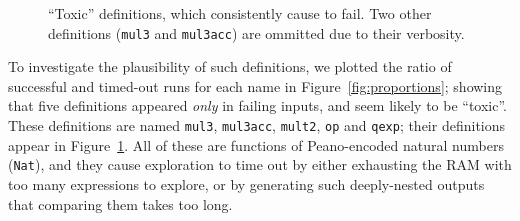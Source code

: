 \begin{figure}
  \iffalse
  \begin{verbatim}
    (define-fun-rec mul3 ((x Nat) (y Nat) (z Nat)) Nat
      (match x
        (case Z Z)                          ;; Base case for 0 * y * z
        (case (S x2)
          (match y
            (case Z Z)                      ;; Base case for x * 0 * z
            (case (S x3)
              (match z
                (case Z Z)                  ;; Base case for x * y * 0
                (case (S x4)
                  (match x2
                    (case Z
                      (match x3
                        (case Z
                          (match x4
                            (case Z (S Z))  ;; Base case for 1 * 1 * 1
                            (case (S x5)
                              (S (add3 (mul3 Z Z x4)
                                       (add3 (mul3 (S Z) Z x4)
                                             (mul3 Z (S Z) x4)
                                             (mul3 Z Z (S Z)))
                                       (add3 Z Z x4))))))
                        (case (S x6)
                          (S (add3 (mul3 Z x3 x4)
                                   (add3 (mul3 (S Z) x3 x4)
                                         (mul3 Z (S Z) x4)
                                         (mul3 Z x3 (S Z)))
                                   (add3 Z x3 x4))))))
                    (case (S x7)
                      (S (add3 (mul3 x2 x3 x4)
                               (add3 (mul3 (S Z) x3 x4)
                                     (mul3 x2 (S Z) x4)
                                     (mul3 x2 x3 (S Z)))
                               (add3 x2 x3 x4))))))))))))
  \end{verbatim}
  \fi
  \caption{``Toxic'' definitions, which consistently cause \quickspec{} to fail. Two
    other definitions (\texttt{mul3} and \texttt{mul3acc}) are ommitted due to
    their verbosity.}
  \label{fig:faildefs}
\end{figure}

To investigate the plausibility of such definitions, we plotted the ratio of
successful and timed-out runs for each name in Figure~\ref{fig:proportions}; showing
that five definitions appeared \emph{only} in failing inputs, and seem likely to
be ``toxic''. These definitions are named \texttt{mul3}, \texttt{mul3acc},
\texttt{mult2}, \texttt{op} and \texttt{qexp}; their definitions appear in
Figure~\ref{fig:faildefs}. All of these are functions of Peano-encoded natural
numbers (\texttt{Nat}), and they cause exploration to time out by either
exhausting the RAM with too many expressions to explore, %
or by generating such deeply-nested outputs that comparing them takes too long.

